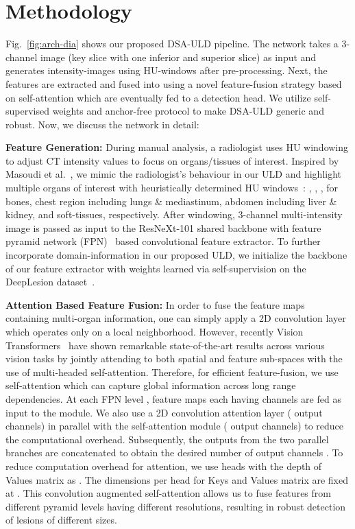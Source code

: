 \documentclass{article}
\begin{document}
\section{Methodology}
\label{methods}
\vspace{-2mm}
Fig.~\ref{fig:arch-dia} shows our proposed DSA-ULD pipeline. The network takes a 3-channel image  (key slice with one inferior and superior slice) as input and generates  intensity-images  using  HU-windows  after pre-processing. Next, the features are extracted and fused into  using a novel feature-fusion strategy based on self-attention which are eventually fed to a detection head. We utilize self-supervised weights and anchor-free protocol to make DSA-ULD generic and robust. Now, we discuss the network in detail:  

\noindent \textbf{Feature Generation:} During manual analysis, a radiologist uses HU windowing to adjust CT intensity values to focus on organs/tissues of interest. Inspired by Masoudi et al.~\cite{masoudi2021quick}, we mimic the radiologist's behaviour in our ULD and
highlight multiple organs of interest with heuristically determined  HU windows~\cite{xue2012window}: , , ,  for bones, chest region including lungs \& mediastinum, abdomen including liver \& kidney, and soft-tissues, respectively. After windowing, 3-channel multi-intensity image  is passed as input to the ResNeXt-101 shared backbone with feature pyramid network (FPN)~\cite{lin2017featurefpn} based convolutional feature extractor. To further incorporate domain-information in our proposed ULD, we initialize the backbone of our feature extractor with weights learned via self-supervision on the DeepLesion dataset~\cite{grill2020bootstrap}.

\noindent \textbf{Attention Based Feature Fusion:} In order to fuse the feature maps  containing multi-organ information, one can simply apply a 2D convolution layer which operates only on a local neighborhood. However, recently Vision Transformers~\cite{ViT} have shown remarkable state-of-the-art results across various vision tasks by jointly attending to both spatial and feature sub-spaces with the use of multi-headed self-attention. Therefore, for efficient feature-fusion, we use self-attention which can capture global information across long range dependencies. At each FPN level ,  feature maps each having  channels are fed as input to the module. We also use a 2D convolution attention layer ( output channels) in parallel with the self-attention module ( output channels) to reduce the computational overhead. Subsequently, the outputs from the two parallel branches are concatenated to obtain the desired number of output channels . To reduce computation overhead for attention, we use  heads with the depth of Values matrix as . The dimensions per head for Keys and Values matrix are fixed at . This convolution augmented self-attention allows us to fuse features from different pyramid levels having different resolutions, resulting in robust detection of lesions of different sizes.
\end{document}

